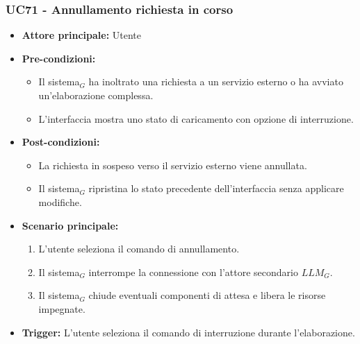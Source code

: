 \documentclass[a4paper, 10pt]{article}
\begin{document}
\subsubsection{UC71 - Annullamento richiesta in corso}
\hypertarget{uc:71}{}
\begin{itemize}
    \item \textbf{Attore principale:} Utente
    \item \textbf{Pre-condizioni:} 
        \begin{itemize}
            \item Il sistema$_G$ ha inoltrato una richiesta a un servizio esterno o ha avviato un'elaborazione complessa.
            \item L'interfaccia mostra uno stato di caricamento con opzione di interruzione.
        \end{itemize}
    \item \textbf{Post-condizioni:} 
        \begin{itemize}
            \item La richiesta in sospeso verso il servizio esterno viene annullata.
            \item Il sistema$_G$ ripristina lo stato precedente dell'interfaccia senza applicare modifiche.
        \end{itemize}
    \item \textbf{Scenario principale:}
        \begin{enumerate}
            \item L'utente seleziona il comando di annullamento.
            \item Il sistema$_G$ interrompe la connessione con l'attore secondario $LLM_G$.
            \item Il sistema$_G$ chiude eventuali componenti di attesa e libera le risorse impegnate.
        \end{enumerate}
    \item \textbf{Trigger:} L'utente seleziona il comando di interruzione durante l'elaborazione.
\end{itemize}
\end{document}
